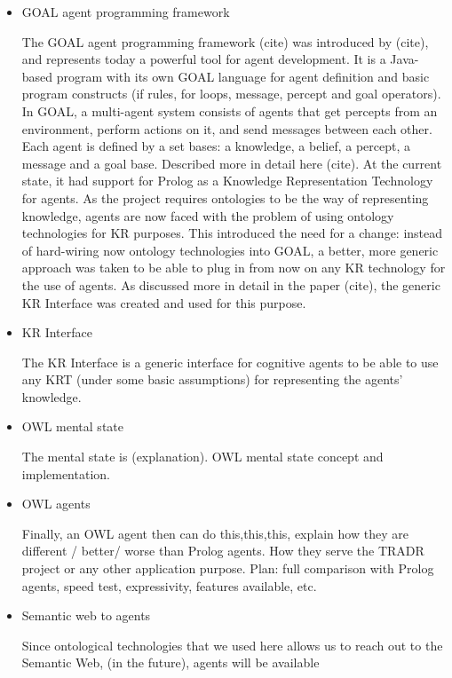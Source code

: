 \begin{itemize}
\item GOAL agent programming framework

The GOAL agent programming framework (cite) was introduced by (cite), and represents today a powerful tool for agent development. It is a Java-based program with its own GOAL language for agent definition and basic program constructs (if rules, for loops, message, percept and goal operators). 
In GOAL, a multi-agent system consists of agents that get percepts from an environment, perform actions on it, and send messages between each other. Each agent is defined by a set bases: a knowledge, a belief, a percept, a message and a goal base. Described more in detail here (cite).
At the current state, it had support for Prolog as a Knowledge Representation Technology for agents. 
As the project requires ontologies to be the way of representing knowledge, agents are now faced with the problem of using ontology technologies for KR purposes. This introduced the need for a change: instead of hard-wiring now ontology technologies into GOAL, a better, more generic approach was taken to be able to plug in from now on any KR technology for the use of agents. As discussed more in detail in the paper (cite), the generic KR Interface was created and used for this purpose.

\item KR Interface

The KR Interface is a generic interface for cognitive agents to be able to use any KRT (under some basic assumptions) for representing the agents' knowledge. 


\item OWL mental state

The mental state is (explanation).
OWL mental state concept and implementation.

\item OWL agents

Finally, an OWL agent then can do this,this,this, explain how they are different / better/ worse than Prolog agents. How they serve the TRADR project or any other application purpose. 
Plan: full comparison with Prolog agents, speed test, expressivity, features available, etc.

\item Semantic web to agents

Since ontological technologies that we used here allows us to reach out to the Semantic Web,
(in the future), agents will be available 

\end{itemize}
  
  
  
  
  